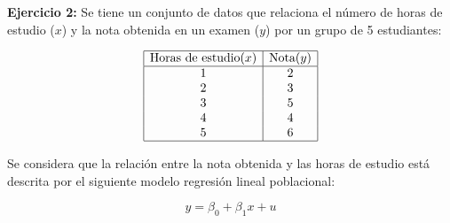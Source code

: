 \documentclass[10pt,a4paper]{article}
\begin{document}
\vspace{0.5cm}


\textbf{Ejercicio 2:} 
Se tiene un conjunto de datos que relaciona el número de horas de estudio (\(x\)) y la nota obtenida en un examen (\(y\)) por un grupo de 5 estudiantes:

\[
\begin{array}{|c|c|}
\hline
\text{Horas de estudio} (x) & \text{Nota} (y) \\
\hline
1 & 2 \\
2 & 3 \\
3 & 5 \\
4 & 4 \\
5 & 6 \\
\hline
\end{array}
\]

Se considera que la relación entre la nota obtenida y las horas de estudio 
est\'a descrita por el siguiente modelo regresión lineal poblacional:

\[
y = \beta_0 + \beta_1 x+u
\]
\end{document}
